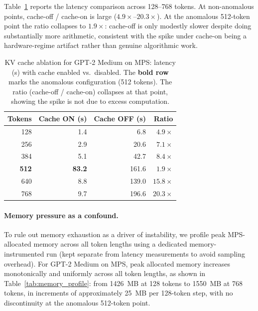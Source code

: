 \documentclass{article}
\begin{document}
Table~\ref{tab:kv_ablation} reports the latency comparison across 128--768 tokens. At non-anomalous points, cache-off / cache-on is large ($4.9\times$--$20.3\times$). At the anomalous 512-token point the ratio collapses to $1.9\times$: cache-off is only modestly slower despite doing substantially more arithmetic, consistent with the spike under cache-on being a hardware-regime artifact rather than genuine algorithmic work.

\begin{table}[h]
\centering
\caption{KV cache ablation for GPT-2 Medium on MPS: latency (s) with cache enabled vs.\ disabled. The \textbf{bold row} marks the anomalous configuration (512 tokens). The ratio (cache-off / cache-on) collapses at that point, showing the spike is not due to excess computation.}
\label{tab:kv_ablation}
\begin{tabular}{r rr r}
\toprule
Tokens & Cache ON (s) & Cache OFF (s) & Ratio \\
\midrule
128 & 1.4  & 6.8   & $4.9\times$ \\
256 & 2.9  & 20.6  & $7.1\times$ \\
384 & 5.1  & 42.7  & $8.4\times$ \\
\textbf{512} & \textbf{83.2} & 161.6 & $1.9\times$ \\
640 & 8.8  & 139.0 & $15.8\times$ \\
768 & 9.7  & 196.6 & $20.3\times$ \\
\bottomrule
\end{tabular}
\end{table}

\paragraph{Memory pressure as a confound.}
To rule out memory exhaustion as a driver of instability, we profile peak MPS-allocated memory across all token lengths using a dedicated memory-instrumented run (kept separate from latency measurements to avoid sampling overhead).
For GPT-2 Medium on MPS, peak allocated memory increases monotonically and uniformly across all token lengths, as shown in Table~\ref{tab:memory_profile}: from 1426\ MB at 128 tokens to 1550\ MB at 768 tokens, in increments of approximately 25\ MB per 128-token step, with no discontinuity at the anomalous 512-token point.
\end{document}
